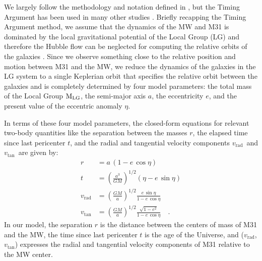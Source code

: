 \documentclass[twocolumn]{aastex631}
\newcommand{\mlg}{\ensuremath{\textrm{M}_{\rm LG}}}
\newcommand{\vtan}{\ensuremath{v_\textrm{tan}}}
\newcommand{\vrad}{\ensuremath{v_\textrm{rad}}}
\begin{document}
We largely follow the methodology and notation defined in
\citet{Penarrubia2016}, but the Timing Argument has been used in many other
studies \citep[e.g.,][]{stuff}.
Briefly recapping the Timing Argument method, we assume that the dynamics of the
MW and M31 is dominated by the local gravitational potential of the Local Group
(LG) and therefore the Hubble flow can be neglected for computing the relative
orbits of the galaxies \citep[see, e.g.,][]{someone}.
Since we observe something close to the relative position and motion between M31
and the MW, we reduce the dynamics of the galaxies in the LG system to a single
Keplerian orbit that specifies the relative orbit between the galaxies and is
completely determined by four model parameters: the total mass of the Local
Group \mlg, the semi-major axis $a$, the eccentricity $e$, and the present value
of the eccentric anomaly $\eta$.

In terms of these four model parameters, the closed-form equations for relevant
two-body quantities like the separation between the masses $r$, the elapsed time
since last pericenter $t$, and the radial and tangential velocity components
\vrad\ and \vtan\ are given by:
\begin{align}
  r &= a \, (1-e\,\cos\eta) \label{eq:r} \\
  t &= \left( \frac{a^3}{GM} \right)^{1/2}(\eta-e\,\sin\eta) \label{eq:t} \\
  \vrad &= \left( \frac{GM}{a} \right)^{1/2} \frac{e\,\sin\eta}{1-e\,\cos\eta} \label{eq:vrad} \\
  \vtan &= \left( \frac{GM}{a} \right)^{1/2} \frac{\sqrt{1-e^2}}{1-e\,\cos\eta} \label{eq:vtan} \quad .
\end{align}
In our model, the separation $r$ is the distance between the centers of mass of
M31 and the MW, the time since last pericenter $t$ is the age of the Universe,
and (\vrad, \vtan) expresses the radial and tangential velocity components of
M31 relative to the MW center.
\end{document}
